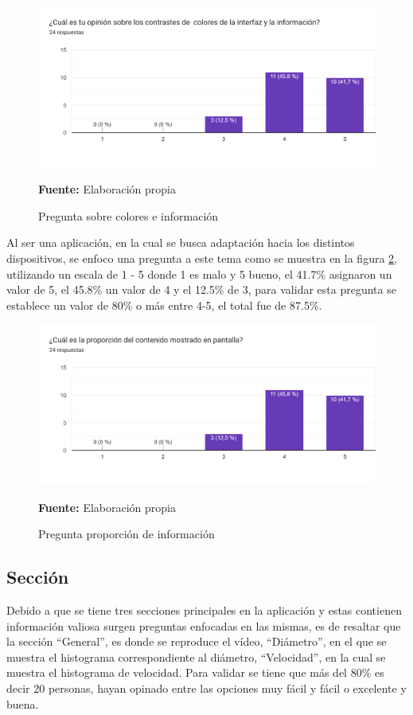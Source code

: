 \documentclass[12pt,twocolumn,a4paper]{article}
\begin{document}
\begin{figure}
	\centering
	\includegraphics[scale=0.2]{Encuesta4.png}
	\caption{Pregunta sobre colores e información} \textbf{Fuente:} Elaboración propia 
	\label{Encuesta4}
\end{figure}

Al ser una aplicación, en la cual se busca adaptación hacia los distintos dispositivos, se enfoco una pregunta a este tema como se muestra en la figura \ref{Encuesta5}, utilizando un escala de 1 - 5 donde 1 es malo y 5 bueno, el 41.7\% asignaron un valor de 5, el 45.8\% un valor de 4 y el 12.5\% de 3, para validar esta pregunta se establece  un valor de 80\% o más entre 4-5, el total fue de 87.5\%.

\begin{figure}
	\centering
	\includegraphics[scale=0.2]{Encuesta5.png}
	\caption{Pregunta proporción de información} \textbf{Fuente:} Elaboración propia 
	\label{Encuesta5}
\end{figure}

\subsection{Sección}

Debido a que se tiene tres secciones principales en la aplicación y estas contienen información valiosa surgen preguntas enfocadas en las mismas, es de resaltar que la sección “General”, es  donde se reproduce el vídeo, “Diámetro”, en el que se muestra el histograma correspondiente al diámetro, “Velocidad”, en la cual se muestra el histograma de velocidad. Para validar se tiene que más del 80\%  es decir 20 personas, hayan opinado entre las opciones muy fácil y fácil o excelente y buena.
\end{document}
